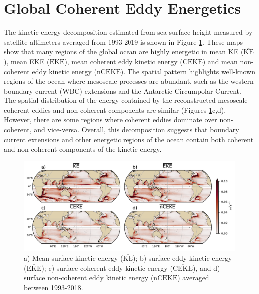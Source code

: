 \documentclass[draft,linenumbers]{agujournal2019}
\newcommand{\MKE}{\overline{\textrm{KE}}}
\newcommand{\MEKE}{\overline{\textrm{EKE}}}
\newcommand{\MCEKE}{\overline{\textrm{CEKE}}}
\newcommand{\MnCEKE}{\overline{\textrm{nCEKE}}}
\begin{document}
	\section{Global Coherent Eddy Energetics}
	\label{sec:CEKE_climatology}


	The kinetic energy decomposition estimated from sea surface height measured by satellite altimeters averaged from 1993-2019 is shown in Figure \ref{fig:eddy_climatology}. 
	These maps show that many regions of the global ocean are highly energetic in mean KE ($\MKE$), mean EKE ($\MEKE$), mean coherent eddy kinetic energy ($\MCEKE$) and mean non-coherent eddy kinetic energy ($\MnCEKE$). 
	The spatial pattern highlights well-known regions of the ocean where mesoscale processes are abundant, such as the western boundary current (WBC) extensions and the Antarctic Circumpolar Current. 
	The spatial distribution of the energy contained by the reconstructed mesoscale coherent eddies and non-coherent components are similar (Figures \ref{fig:eddy_climatology}c,d). 
	However, there are some regions where coherent eddies dominate over non-coherent, and vice-versa. 
	Overall, this decomposition suggests that boundary current extensions and other energetic regions of the ocean contain both coherent and non-coherent components of the kinetic energy.

	\begin{figure}[t]
	    \centering
	    \includegraphics[width=1\textwidth]{figures/mean_ke_maps_satellite.pdf}
	    \caption{a) Mean surface kinetic energy ($\MKE$); b) surface eddy kinetic energy ($\MEKE$); c) surface coherent eddy kinetic energy ($\MCEKE$), and d) surface non-coherent eddy kinetic energy ($\MnCEKE$) averaged between 1993-2018.}
	    \label{fig:eddy_climatology}
	\end{figure}
\end{document}
